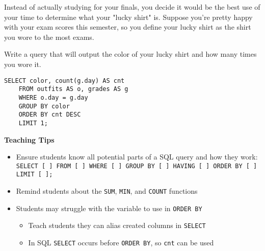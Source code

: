 \begin{blocksection}
\question
Instead of actually studying for your finals, you decide it would be the best use of your time to determine what your "lucky shirt" is. Suppose you're pretty happy with your exam scores this semester, so you define your lucky shirt as the shirt you wore to the most exams.

Write a query that will output the color of your lucky shirt and how many times you wore it.

\begin{solution}[1.5in]
\begin{lstlisting}
SELECT color, count(g.day) AS cnt
    FROM outfits AS o, grades AS g
    WHERE o.day = g.day
    GROUP BY color
    ORDER BY cnt DESC
    LIMIT 1;
\end{lstlisting}
\end{solution}
\end{blocksection}

\begin{guide}
\begin{blocksection}
\textbf{Teaching Tips}
\begin{itemize}
  \item Ensure students know all potential parts of a SQL query and how they work:
  \\\lstinline{SELECT [ ] FROM [ ] WHERE [ ] GROUP BY [ ] HAVING [ ] ORDER BY [ ] LIMIT [ ];}
  \item Remind students about the \lstinline{SUM}, \lstinline{MIN}, and \lstinline{COUNT} functions
  \item Students may struggle with the variable to use in \lstinline{ORDER BY}
  \begin{itemize}
    \item Teach students they can alias created columns in \lstinline{SELECT}
    \item In SQL \lstinline{SELECT} occurs before \lstinline{ORDER BY}, so \lstinline{cnt} can be used
  \end{itemize}
\end{itemize}
\end{blocksection}
\end{guide}
